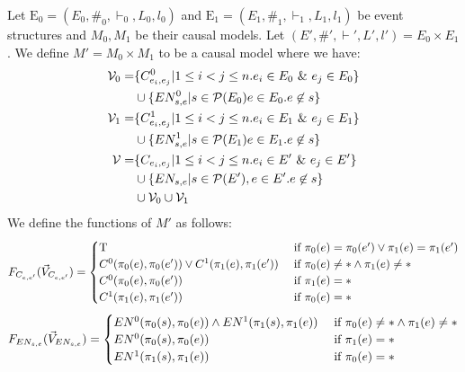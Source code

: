 \begin{definition}
    Let $\mathrm{E}_0 = (E_0,\#_0,\vdash_0,L_0,l_0)$ and
    $\mathrm{E}_1 = (E_1,\#_1,\vdash_1,L_1,l_1)$ be event structures and
    $M_0,M_1$ be their causal models.
    Let $(E',\#',\vdash',L',l') = E_0 \times E_1$.
    We define $M' = M_0 \times M_1$ to be a causal model where we have:
    \begin{align*}
        \mathcal{V}_0 = & \{C_{e_i,e_j}^0 |  1 \leq i < j \leq n.
        e_i \in E_0 \ \& \  e_j \in E_0\}                                 \\
                        & \cup \{EN_{s,e}^0 | s \in \mathcal{P}(E_0)
        e \in E_0. e \not \in s \}                                     \\
        \mathcal{V}_1 = & \{C_{e_i,e_j}^1 |  1 \leq i < j \leq n.
        e_i \in E_1 \ \& \  e_j \in E_1\}                                 \\
                        & \cup \{EN_{s,e}^1 | s \in \mathcal{P}(E_1)
        e \in E_1. e \not \in s \}                                     \\
        \mathcal{V} =   & \{C_{e_i,e_j} |  1 \leq i < j \leq n.
        e_i \in E' \ \& \  e_j \in E'\}                                   \\
                        & \cup \{EN_{s,e} | s \in \mathcal{P}(E'),
        e \in E'. e \not \in s \}                                      \\
                        & \cup \mathcal{V}_0 \cup \mathcal{V}_1
    \end{align*}
    We define the functions of $M'$ as follows:
    $$
        F_{C_{e,e'}}(\vec V_{C_{e,e'}}) = \begin{cases}
            \mathrm{T} & \text{ if } \pi_0(e) = \pi_0(e') \vee \pi_1(e) = \pi_1(e') \\
            C^0(\pi_0(e),\pi_0(e')) \vee  C^1(\pi_1(e),\pi_1(e'))
               & \text { if } \pi_0(e) \neq * \wedge \pi_1(e) \neq *        \\
            C^0(\pi_0(e),\pi_0(e'))
               & \text { if } \pi_1(e) = *                                  \\
            C^1(\pi_1(e),\pi_1(e'))
               & \text { if } \pi_0(e) = *                                  \\
        \end{cases}
    $$
    $$
        F_{EN_{s,e}}(\vec V_{EN_{s,e}}) = \begin{cases}
            EN^0(\pi_0(s),\pi_0(e)) \wedge EN^1(\pi_1(s),\pi_1(e))
                                    & \text{ if } \pi_0(e) \neq * \wedge \pi_1(e) \neq * \\
            EN^0(\pi_0(s),\pi_0(e)) & \text{ if } \pi_1(e) = *                           \\
            EN^1(\pi_1(s),\pi_1(e)) & \text{ if } \pi_0(e) = *                           \\
        \end{cases}
    $$
\end{definition}
